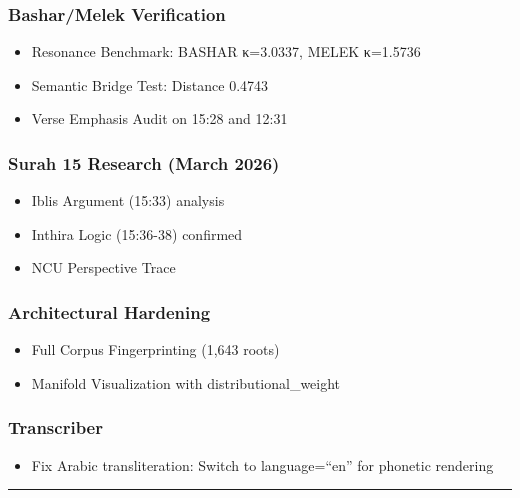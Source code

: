 \documentclass[12pt,a4paper]{article}
\providecommand{\tightlist}{\setlength{\itemsep}{0pt}\setlength{\parskip}{0pt}}
\begin{document}
\subsubsection{Bashar/Melek
Verification}\label{basharmelek-verification}

\begin{itemize}
\tightlist
\item
  Resonance Benchmark: BASHAR κ=3.0337, MELEK κ=1.5736
\item
  Semantic Bridge Test: Distance 0.4743
\item
  Verse Emphasis Audit on 15:28 and 12:31
\end{itemize}

\subsubsection{Surah 15 Research (March
2026)}\label{surah-15-research-march-2026}

\begin{itemize}
\tightlist
\item
  Iblis Argument (15:33) analysis
\item
  Inthira Logic (15:36-38) confirmed
\item
  NCU Perspective Trace
\end{itemize}

\subsubsection{Architectural Hardening}\label{architectural-hardening}

\begin{itemize}
\tightlist
\item
  Full Corpus Fingerprinting (1,643 roots)
\item
  Manifold Visualization with distributional\_weight
\end{itemize}

\subsubsection{Transcriber}\label{transcriber}

\begin{itemize}
\tightlist
\item
  Fix Arabic transliteration: Switch to language=``en'' for phonetic
  rendering
\end{itemize}

\begin{center}\rule{0.5\linewidth}{0.5pt}\end{center}
\end{document}
